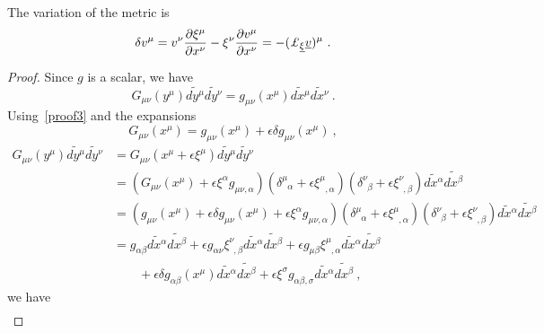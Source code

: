     The variation of the metric is  
    \begin{equation}\label{diffeo}
        \delta v^\mu = v^\nu \pdv{\xi^\mu}{x^\nu} - \xi^\nu \pdv{v^\mu}{x^\nu} = - (\pounds_{\underline \xi} \underline v)^\mu ~.
    \end{equation}
    \begin{proof}
        Since $g$ is a scalar, we have 
        \begin{equation*}
            G_{\mu\nu} (y^\mu) \tilde{dy^\mu} \tilde{dy^\nu} = g_{\mu\nu} (x^\mu) \tilde{dx^\mu} \tilde{dx^\nu} ~.
        \end{equation*}
        Using~\eqref{proof3} and the expansions 
        \begin{equation*}
            G_{\mu\nu} (x^\mu) = g_{\mu\nu} (x^\mu) + \epsilon \delta g_{\mu\nu}(x^\mu) ~,
        \end{equation*}
        \begin{equation*}
        \begin{aligned}
            G_{\mu\nu} (y^\mu) \tilde{dy^\mu} \tilde{dy^\nu} & = G_{\mu\nu} (x^\mu + \epsilon \xi^\mu) \tilde{dy^\mu} \tilde{dy^\nu} \\ & =   ( G_{\mu\nu} (x^\mu) + \epsilon \xi^\alpha g_{\mu\nu,\alpha}  )   (\delta^\mu_{\phantom \mu \alpha} + \epsilon \xi^\mu_{\phantom \mu,\alpha} )   (\delta^\nu_{\phantom \nu \beta} + \epsilon \xi^\nu_{\phantom \nu,\beta}  ) \tilde{dx^\alpha} \tilde{dx^\beta} \\ & =   ( g_{\mu\nu} (x^\mu) + \epsilon \delta g_{\mu\nu}(x^\mu) + \epsilon \xi^\alpha g_{\mu\nu,\alpha}  )   (\delta^\mu_{\phantom \mu \alpha} + \epsilon \xi^\mu_{\phantom \mu,\alpha} )   (\delta^\nu_{\phantom \nu \beta} + \epsilon \xi^\nu_{\phantom \nu,\beta}  ) \tilde{dx^\alpha} \tilde{dx^\beta} \\ & = g_{\alpha \beta} \tilde{dx^\alpha} \tilde{dx^\beta} + \epsilon g_{\alpha\nu} \xi^\nu_{\phantom \nu, \beta} \tilde{dx^\alpha} \tilde{dx^\beta} + \epsilon g_{\mu\beta} \xi^\mu_{\phantom \mu, \alpha} \tilde{dx^\alpha} \tilde{dx^\beta} \\ & \qquad + \epsilon \delta g_{\alpha\beta} (x^\mu) \tilde{dx^\alpha} \tilde{dx^\beta} + \epsilon \xi^\sigma g_{\alpha\beta,\sigma} \tilde{dx^\alpha} \tilde{dx^\beta} ~,
        \end{aligned}
        \end{equation*} 
        we have 
        \begin{equation*}
        \begin{aligned}

\end{aligned}
\end{equation*}
\end{proof}
